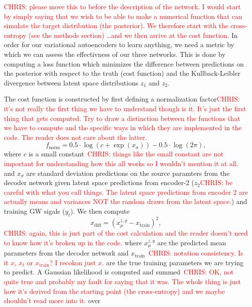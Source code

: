 \documentclass[%
showpacs,
 amsmath,amssymb,
 aps,
 twocolumn,
 prl,
 reprint,
floatfix,
]{revtex4-1}
\newcommand{\chris}[1]{\textcolor{red}{CHRIS: #1}}
\begin{document}
%
%
\chris{please move this to before the description of the network. I would start
by simply saying that we wish to be able to make a numerical function that can
simulate the target distribution (the posterior). We therefore start with the
cross-entropy (see the methods section) \ldots and we then arrive at the cost
function.}
In order for our variational autoencoders to learn anything, we need a metric
by which we can assess the effectivness of our three networks. This is done by
computing a loss function which minimizes the difference between predictions on
the posterior with respect to the truth (cost function) and the
Kullback-Leibler divergence between latent space distributions $z_1$ and $z_2$. 

%
%
The cost function is constructed by first defining a normalization
factor\chris{it's not really the first thing we have to understand though is
it. It's just the first thing that gets computed. Try to draw a distinction
between the functions that we have to compute and the specific ways in which
they are implemented in the code. The reader does not care about the latter.}
%
\begin{equation}
    f_{\textrm{norm}} = 0.5 \cdot \log(c + \exp(x_{\sigma})) - 0.5 \cdot \log(2\pi),
\end{equation}
%
where $c$ is a small constant~\chris{things like the small constant are not
important for understanding how this all works so I wouldn't mention it at all.}
and $x_{\sigma}$ are standard deviation predictions on the source paramters
from the decoder network given latent space predictions from encoder-2
($z_2$\chris{be careful with what you call things.  The latent space
predictions from encoder 2 are actually means and variances NOT the random
draws from the latent space.}) and training GW sigals ($y_{t}$). We then
compute 
%
\begin{equation}
    x_{\textrm{diff}} = (x^{z,y}_{\mu} - x_{\textrm{train}})^{2},
\end{equation}
%
\chris{again, this is just part of the cost calculation and the reader doesn't
need to know how it's broken up in the code.} where $x^{z,y}_{\mu}$ are the
predicted mean parameters from the decoder network and
$x_{\textrm{train}}$~\chris{notation consistency. Is it $x$, $x_t$ or
$x_{\text{train}}$? I recokon just $x$.} are the true training parameters we
are trying to predict. A Gaussian likelihood is computed and summed~\chris{OK,
not quite true and probably my fault for saying that it was. The whole thing is
just how it's derived from the starting point (the cross-entropy) and we maybe
shouldn't read more into it.} over
\end{document}
